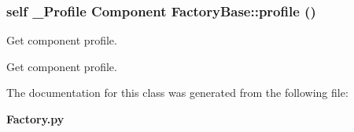 \subsubsection{\setlength{\rightskip}{0pt plus 5cm}self \_\-Profile Component Factory\-Base::profile ()\hspace{0.3cm}{\tt  [inherited]}}\label{classFactoryBase_FactoryPythona5}


Get component profile. 

Get component profile.

The documentation for this class was generated from the following file:\begin{CompactItemize}
\item 
{\bf Factory.py}\end{CompactItemize}
